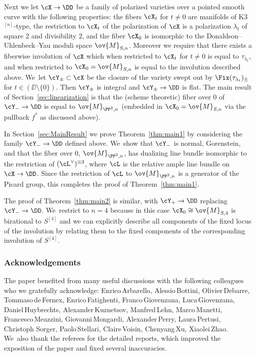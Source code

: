 Next we let $\cX\to\DD$ be a family of polarized varieties over a pointed smooth curve with the following properties: the fibers $\cX_t$ for $t\not=0$ are \HK manifolds of K3$^{[n]}$-type, the restriction to $\cX_t$ of the polarization of $\cX$ is a polarization $\lambda_t$ of square $2$ and divisibility $2$, and the fiber $\cX_0$ is isomorphic to the Donaldson--Uhlenbeck--Yau moduli space $\ov{M}_{S,n}$.
Moreover we require that there exists a fiberwise involution of $\cX$ which when restricted to $\cX_t$ for $t\not=0$ is equal to $\tau_{\lambda_t}$, and when restricted to $\cX_0=\ov{M}_{S,n}$ is equal to the involution described above. We~let $\cY_{\pm}\subset\cX$ be the closure of the variety swept out by $\Fix(\tau_{\lambda_t})_{\pm}$ for $t\in(\DD\setminus\{0\})$.
Then $\cY_{\pm}$ is integral and $\cY_{\pm}\to\DD$ is flat.
The main result of Section~\ref{sec:linearization} is that the (scheme theoretic) fiber over $0$ of $\cY_{-}\to\DD$ is equal to $\ov{M}_{\PP^2,n}$ (embedded in $\cX_0=\ov{M}_{S,n}$ via the pullback $f^*$ as discussed above).

In Section~\ref{sec:MainResult} we prove Theorem~\ref{thm:main1} by considering the family $\cY_{-}\to\DD$ defined above. We~show that $\cY_{-}$ is normal, Gorenstein, and that the fiber over $0$, \ie $\ov{M}_{\PP^2,n}$, has dualizing line bundle isomorphic to the restriction of $(\cL^{\vee})^{\otimes 3}$, where $\cL$ is the relative ample line bundle on $\cX\to\DD$.
Since the restriction of $\cL$ to $\ov{M}_{\PP^2,n}$ is a generator of the Picard group, this completes the proof of Theorem~\ref{thm:main1}.

The proof of Theorem~\ref{thm:main2} is similar, with $\cY_{+}\to\DD$ replacing $\cY_{-}\to\DD$. We~restrict to $n=4$ because in this case $\cX_0\cong \ov{M}_{S,4}$ is birational to $S^{[4]}$ and we can explicitly describe all components of the fixed locus of the involution by relating them to the fixed components of the corresponding involution of $S^{[4]}$.

\subsubsection*{Acknowledgements}
The paper benefited from many useful discussions with the following colleagues who we gratefully acknowledge: Enrico\,Arbarello, Alessio\,\hbox{Bottini}, Olivier\,Debarre, Tommaso\,de\,Fernex, Enrico\,Fatighenti, Franco\,Giovenzana, Luca\,Gio\-ven\-zana, Daniel\,Huybrechts, Alexander\,Kuznetsov, Manfred\,Lehn, Marco\,Manetti, Francesco\,Meazzini, Giovanni\,Mongardi, Alexander\,Perry, Laura\,Pertusi, Christoph Sorger, Paolo\,Stellari, Claire\,Voisin, Chenyang\,Xu, Xiaolei\,Zhao. We~also thank the referees for the detailed reports, which improved the exposition of the paper and fixed several inaccuracies.

